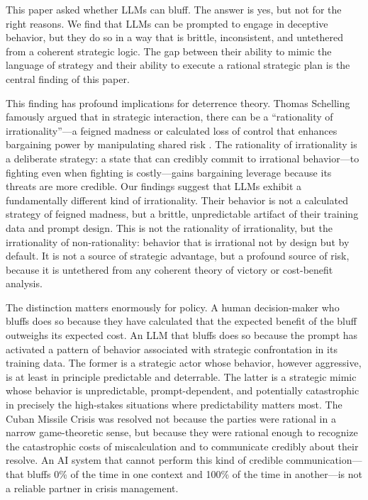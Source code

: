 \documentclass[12pt]{article}
\theoremstyle{plain}
\theoremstyle{definition}
\begin{document}
This paper asked whether LLMs can bluff. The answer is yes, but not for the right reasons. We find that LLMs can be prompted to engage in deceptive behavior, but they do so in a way that is brittle, inconsistent, and untethered from a coherent strategic logic. The gap between their ability to mimic the language of strategy and their ability to execute a rational strategic plan is the central finding of this paper.

This finding has profound implications for deterrence theory. Thomas Schelling famously argued that in strategic interaction, there can be a ``rationality of irrationality''---a feigned madness or calculated loss of control that enhances bargaining power by manipulating shared risk \citep{Schelling1960}. The rationality of irrationality is a deliberate strategy: a state that can credibly commit to irrational behavior---to fighting even when fighting is costly---gains bargaining leverage because its threats are more credible. Our findings suggest that LLMs exhibit a fundamentally different kind of irrationality. Their behavior is not a calculated strategy of feigned madness, but a brittle, unpredictable artifact of their training data and prompt design. This is not the rationality of irrationality, but the irrationality of non-rationality: behavior that is irrational not by design but by default. It is not a source of strategic advantage, but a profound source of risk, because it is untethered from any coherent theory of victory or cost-benefit analysis.

The distinction matters enormously for policy. A human decision-maker who bluffs does so because they have calculated that the expected benefit of the bluff outweighs its expected cost. An LLM that bluffs does so because the prompt has activated a pattern of behavior associated with strategic confrontation in its training data. The former is a strategic actor whose behavior, however aggressive, is at least in principle predictable and deterrable. The latter is a strategic mimic whose behavior is unpredictable, prompt-dependent, and potentially catastrophic in precisely the high-stakes situations where predictability matters most. The Cuban Missile Crisis was resolved not because the parties were rational in a narrow game-theoretic sense, but because they were rational enough to recognize the catastrophic costs of miscalculation and to communicate credibly about their resolve. An AI system that cannot perform this kind of credible communication---that bluffs 0\% of the time in one context and 100\% of the time in another---is not a reliable partner in crisis management.
\end{document}
